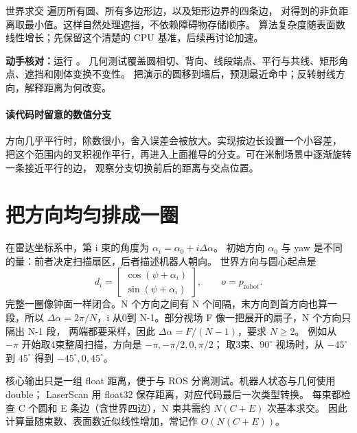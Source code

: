 世界求交  遍历所有圆、所有多边形边，以及矩形边界的四条边，
对得到的非负距离取最小值。这样自然处理遮挡，不依赖障碍物存储顺序。
算法复杂度随表面数线性增长；先保留这个清楚的 CPU 基准，后续再讨论加速。

\textbf{动手核对：}运行 。
几何测试覆盖圆相切、背向、线段端点、平行与共线、矩形角点、遮挡和刚体变换不变性。
把演示的圆移到墙后，预测最近命中；反转射线方向，解释距离为何改变。

\paragraph{读代码时留意的数值分支}
方向几乎平行时，除数很小，舍入误差会被放大。实现按边长设置一个小容差，
把这个范围内的叉积视作平行，再进入上面推导的分支。可在米制场景中逐渐旋转一条接近平行的边，
观察分支切换前后的距离与交点位置。

\section{把方向均匀排成一圈}
在雷达坐标系中，第 i 束的角度为 $\alpha_i=\alpha_0+i\Delta\alpha$。
初始方向 $\alpha_0$ 与 yaw 是不同的量：前者决定扫描扇区，后者描述机器人朝向。
世界方向与圆心起点是
\begin{equation}
d_i=\begin{bmatrix}\cos(\psi+\alpha_i)\\\sin(\psi+\alpha_i)\end{bmatrix},
\qquad o=p_{\mathrm{robot}}.
\end{equation}
完整一圈像钟面一样闭合。N 个方向之间有 N 个间隔，末方向到首方向也算一段，所以
$\Delta\alpha=2\pi/N$，i 从0到 N-1。部分视场 F 像一把展开的扇子，N 个方向只隔出 N-1 段，
两端都要采样，因此 $\Delta\alpha=F/(N-1)$，要求 $N\geq2$。
例如从 $-\pi$ 开始取4束整周扫描，方向是 $-\pi,-\pi/2,0,\pi/2$；
取3束、$90^\circ$ 视场时，从 $-45^\circ$ 到 $45^\circ$ 得到 $-45^\circ,0,45^\circ$。

\par\noindent\begin{minipage}{\linewidth}

\end{minipage}\par

核心输出只是一组 float 距离，便于与 ROS 分离测试。机器人状态与几何使用 double；
LaserScan 用 float32 保存距离，对应代码最后一次类型转换。
每束都检查 C 个圆和 E 条边（含世界四边），N 束共需约 $N(C+E)$ 次基本求交。
因此计算量随束数、表面数近似线性增加，常记作 $O(N(C+E))$。

